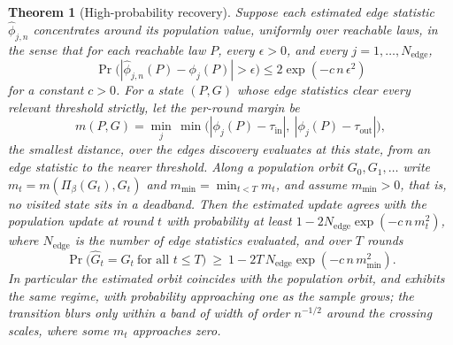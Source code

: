 \documentclass[11pt]{article}
\theoremstyle{plain}
\newtheorem{theorem}{Theorem}
\theoremstyle{definition}
\newcommand{\Pidep}{\Pi_\beta}
\begin{document}
\begin{theorem}[High-probability recovery]\label{thm:finitesample}
Suppose each estimated edge statistic $\hat\phi_{j,n}$ concentrates around its population value, uniformly over reachable laws, in the sense that for each reachable law $P$, every $\epsilon>0$, and every $j=1,\dots,N_{\mathrm{edge}}$,
\begin{equation}\label{eq:concentration}
\Pr\!\big(|\hat\phi_{j,n}(P)-\phi_j(P)|>\epsilon\big)\le 2\exp(-c\,n\,\epsilon^2)
\end{equation}
for a constant $c>0$. For a state $(P,G)$ whose edge statistics clear every relevant threshold strictly, let the per-round margin be
\[
m(P,G)=\min_{j}\,\min\big(|\phi_j(P)-\tau_{\mathrm{in}}|,\ |\phi_j(P)-\tau_{\mathrm{out}}|\big),
\]
the smallest distance, over the edges discovery evaluates at this state, from an edge statistic to the nearer threshold. Along a population orbit $G_0,G_1,\dots$ write $m_t=m(\Pidep(G_t),G_t)$ and $m_{\min}=\min_{t<T}m_t$, and assume $m_{\min}>0$, that is, no visited state sits in a deadband. Then the estimated update agrees with the population update at round $t$ with probability at least $1-2N_{\mathrm{edge}}\exp(-c\,n\,m_t^2)$, where $N_{\mathrm{edge}}$ is the number of edge statistics evaluated, and over $T$ rounds
\begin{equation}\label{eq:Tbound}
\Pr\big(\hat G_t=G_t\ \text{for all }t\le T\big)\ \ge\ 1-2T\,N_{\mathrm{edge}}\exp(-c\,n\,m_{\min}^2).
\end{equation}
In particular the estimated orbit coincides with the population orbit, and exhibits the same regime, with probability approaching one as the sample grows; the transition blurs only within a band of width of order $n^{-1/2}$ around the crossing scales, where some $m_t$ approaches zero.
\end{theorem}
\end{document}
